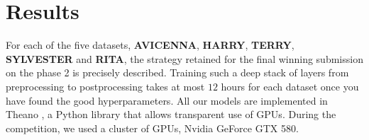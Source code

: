 \section{Results}\label{sec:results}

For each of the five datasets, {\bf AVICENNA}, {\bf HARRY}, {\bf TERRY}, {\bf
SYLVESTER} and {\bf RITA}, the strategy retained for the final winning
submission on the phase 2 is precisely described. Training such a deep stack of
layers from preprocessing to postprocessing takes at most $12$ hours for each
dataset once you have found the good hyperparameters. All our models are
implemented in Theano \citep{bergstra+al:2010-scipy}, a Python library that allows transparent use of GPUs.
During the competition, we used a cluster of GPUs, Nvidia GeForce GTX 580.


